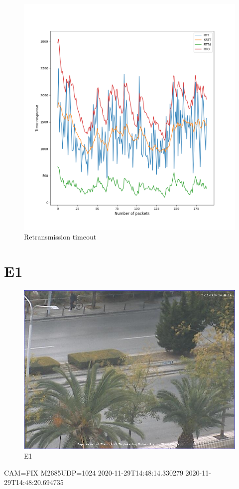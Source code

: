 \documentclass[hidelinks, 12pt, a4paper]{article}
\begin{document}
\begin{figure}[h!]
\centering
	\includegraphics[height=.38\textheight, width=\textwidth]{assets/session2/r1.png}
	\caption{Retransmission timeout} 
\end{figure}



\section{E1}

\begin{figure}[h!]
\centering
	\includegraphics[height=.38\textheight, width=\textwidth]{assets/session2/image_fix.jpg}
	\caption{E1} 
\end{figure}
CAM=FIX
M2685UDP=1024
2020-11-29T14:48:14.330279
2020-11-29T14:48:20.694735
\end{document}
